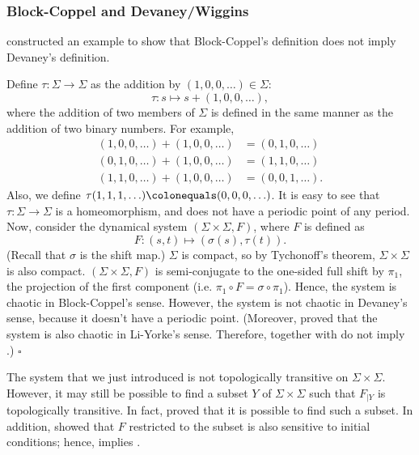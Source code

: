 \documentclass[10pt,twoside,draft]{book}
\begin{document}
\subsubsection*{Block-Coppel and Devaney/Wiggins}
\citet{aulbach} constructed an example to show that Block-Coppel's definition does not imply Devaney's definition.
\begin{example}
  \citep{aulbach} 
  Define $\tau: \Sigma \to \Sigma$ as the addition by $(1, 0, 0, \ldots) \in \Sigma$:
  \begin{equation*}
    \tau: s \mapsto s + (1, 0, 0, \ldots),
  \end{equation*}
  where the addition of two members of $\Sigma$ is defined in the same manner as the addition of two binary numbers.
  For example, 
  \begin{align*}
    (1, 0, 0, \ldots) + (1, 0, 0, \ldots) &= (0, 1, 0, \ldots) \\
    (0, 1, 0, \ldots) + (1, 0, 0, \ldots) &= (1, 1, 0, \ldots) \\
    (1, 1, 0, \ldots) + (1, 0, 0, \ldots) &= (0, 0, 1, \ldots).
  \end{align*}
  Also, we define $\tau(1,1,1, \ldots) \ceq (0,0,0, \ldots)$.
  It is easy to see that $\tau: \Sigma \to \Sigma$ is a homeomorphism, and does not have a periodic point of any period.
  Now, consider the dynamical system $(\Sigma \times \Sigma, F)$, where $F$ is defined as
  \begin{equation*}
    F: (s, t) \mapsto (\sigma(s), \tau(t)).
  \end{equation*}
  (Recall that $\sigma$ is the shift map.)
  $\Sigma$ is compact, so by Tychonoff's theorem, $\Sigma \times \Sigma$ is also compact.
  $(\Sigma \times \Sigma, F)$ is semi-conjugate to the one-sided full shift by $\pi_1$, the projection of the first component (i.e. $\pi_1 \circ F = \sigma \circ \pi_1$).
  Hence, the system is chaotic in Block-Coppel's sense.
  However, the system is not chaotic in Devaney's sense, because it doesn't have a periodic point.
  (Moreover, \citet{blockcoppel} proved that the system is also chaotic in Li-Yorke's sense.
  Therefore, \blcp together with \liy do not imply \dev.)
  $\square$
\end{example}
The system that we just introduced is not topologically transitive on $\Sigma \times \Sigma$.
However, it may still be possible to find a subset $Y$ of $\Sigma \times \Sigma$ such that $F_{|Y}$ is topologically transitive.
In fact, \citet{auslander} proved that it is possible to find such a subset.
In addition, \citet{auslander} showed that $F$ restricted to the subset is also sensitive to initial conditions; hence, \blcp implies \wig.
\end{document}
